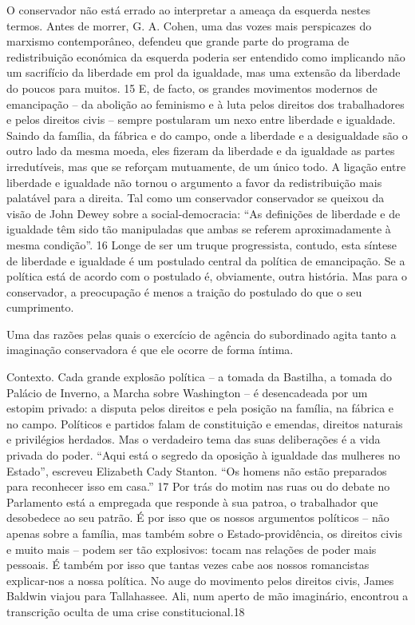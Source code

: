  \par 
O conservador não está errado ao interpretar a ameaça da esquerda nestes termos. Antes de morrer, G. A. Cohen, uma das vozes mais perspicazes do marxismo contemporâneo, defendeu que grande parte do programa de redistribuição económica da esquerda poderia ser entendido como implicando não um sacrifício da liberdade em prol da igualdade, mas uma extensão da liberdade do poucos para muitos. {\color{blue}15} E, de facto, os grandes movimentos modernos de emancipação – da abolição ao feminismo e à luta pelos direitos dos trabalhadores e pelos direitos civis – sempre postularam um nexo entre liberdade e igualdade. Saindo da família, da fábrica e do campo, onde a liberdade e a desigualdade são o outro lado da mesma moeda, eles fizeram da liberdade e da igualdade as partes irredutíveis, mas que se reforçam mutuamente, de um único todo. A ligação entre liberdade e igualdade não tornou o argumento a favor da redistribuição mais palatável para a direita. Tal como um conservador conservador se queixou da visão de John Dewey sobre a social-democracia: “As definições de liberdade e de igualdade têm sido tão manipuladas que ambas se referem aproximadamente à mesma condição”. {\color{blue}16} Longe de ser um truque progressista, contudo, esta síntese de liberdade e igualdade é um postulado central da política de emancipação. Se a política está de acordo com o postulado é, obviamente, outra história. Mas para o conservador, a preocupação é menos a traição do postulado do que o seu cumprimento.
 \par 
Uma das razões pelas quais o exercício de agência do subordinado agita tanto a imaginação conservadora é que ele ocorre de forma íntima.
 \par 
Contexto. Cada grande explosão política – a tomada da Bastilha, a tomada do Palácio de Inverno, a Marcha sobre Washington – é desencadeada por um estopim privado: a disputa pelos direitos e pela posição na família, na fábrica e no campo. Políticos e partidos falam de constituição e emendas, direitos naturais e privilégios herdados. Mas o verdadeiro tema das suas deliberações é a vida privada do poder. “Aqui está o segredo da oposição à igualdade das mulheres no Estado”, escreveu Elizabeth Cady Stanton. “Os homens não estão preparados para reconhecer isso em casa.” {\color{blue}17} Por trás do motim nas ruas ou do debate no Parlamento está a empregada que responde à sua patroa, o trabalhador que desobedece ao seu patrão. É por isso que os nossos argumentos políticos – não apenas sobre a família, mas também sobre o Estado-providência, os direitos civis e muito mais – podem ser tão explosivos: tocam nas relações de poder mais pessoais. É também por isso que tantas vezes cabe aos nossos romancistas explicar-nos a nossa política. No auge do movimento pelos direitos civis, James Baldwin viajou para Tallahassee. Ali, num aperto de mão imaginário, encontrou a transcrição oculta de uma crise constitucional.{\color{blue}18}
